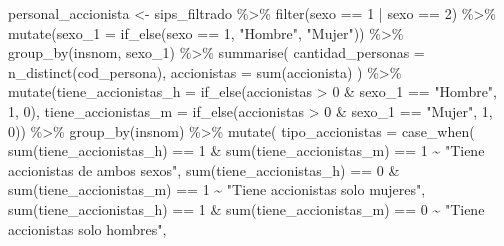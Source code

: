 \documentclass[
  letterpaper,
  DIV=11,
  numbers=noendperiod]{scrreprt}
\newenvironment{Shaded}{\begin{snugshade}}{\end{snugshade}}
\newcommand{\AttributeTok}[1]{\textcolor[rgb]{0.40,0.45,0.13}{#1}}
\newcommand{\DecValTok}[1]{\textcolor[rgb]{0.68,0.00,0.00}{#1}}
\newcommand{\FunctionTok}[1]{\textcolor[rgb]{0.28,0.35,0.67}{#1}}
\newcommand{\NormalTok}[1]{\textcolor[rgb]{0.00,0.23,0.31}{#1}}
\newcommand{\OtherTok}[1]{\textcolor[rgb]{0.00,0.23,0.31}{#1}}
\newcommand{\SpecialCharTok}[1]{\textcolor[rgb]{0.37,0.37,0.37}{#1}}
\newcommand{\StringTok}[1]{\textcolor[rgb]{0.13,0.47,0.30}{#1}}
\begin{document}
\begin{Shaded}
\begin{Highlighting}[]
\NormalTok{personal\_accionista }\OtherTok{\textless{}{-}}\NormalTok{ sips\_filtrado }\SpecialCharTok{\%\textgreater{}\%} 
  \FunctionTok{filter}\NormalTok{(sexo }\SpecialCharTok{==} \DecValTok{1} \SpecialCharTok{|}\NormalTok{ sexo }\SpecialCharTok{==} \DecValTok{2}\NormalTok{) }\SpecialCharTok{\%\textgreater{}\%} 
  \FunctionTok{mutate}\NormalTok{(}\AttributeTok{sexo\_1 =} \FunctionTok{if\_else}\NormalTok{(sexo }\SpecialCharTok{==} \DecValTok{1}\NormalTok{, }\StringTok{"Hombre"}\NormalTok{, }\StringTok{"Mujer"}\NormalTok{)) }\SpecialCharTok{\%\textgreater{}\%} 
  \FunctionTok{group\_by}\NormalTok{(insnom, sexo\_1) }\SpecialCharTok{\%\textgreater{}\%} 
  \FunctionTok{summarise}\NormalTok{(}
    \AttributeTok{cantidad\_personas =} \FunctionTok{n\_distinct}\NormalTok{(cod\_persona),}
    \AttributeTok{accionistas =} \FunctionTok{sum}\NormalTok{(accionista)}
\NormalTok{  ) }\SpecialCharTok{\%\textgreater{}\%} 
  \FunctionTok{mutate}\NormalTok{(}\AttributeTok{tiene\_accionistas\_h =} \FunctionTok{if\_else}\NormalTok{(accionistas }\SpecialCharTok{\textgreater{}} \DecValTok{0} \SpecialCharTok{\&}\NormalTok{ sexo\_1 }\SpecialCharTok{==} \StringTok{"Hombre"}\NormalTok{, }\DecValTok{1}\NormalTok{, }\DecValTok{0}\NormalTok{),}
         \AttributeTok{tiene\_accionistas\_m =} \FunctionTok{if\_else}\NormalTok{(accionistas }\SpecialCharTok{\textgreater{}} \DecValTok{0} \SpecialCharTok{\&}\NormalTok{ sexo\_1 }\SpecialCharTok{==} \StringTok{"Mujer"}\NormalTok{, }\DecValTok{1}\NormalTok{, }\DecValTok{0}\NormalTok{)) }\SpecialCharTok{\%\textgreater{}\%} 
  \FunctionTok{group\_by}\NormalTok{(insnom) }\SpecialCharTok{\%\textgreater{}\%} 
  \FunctionTok{mutate}\NormalTok{(}
    \AttributeTok{tipo\_accionistas =} \FunctionTok{case\_when}\NormalTok{(}
      \FunctionTok{sum}\NormalTok{(tiene\_accionistas\_h) }\SpecialCharTok{==} \DecValTok{1} \SpecialCharTok{\&} \FunctionTok{sum}\NormalTok{(tiene\_accionistas\_m) }\SpecialCharTok{==} \DecValTok{1} \SpecialCharTok{\textasciitilde{}} \StringTok{"Tiene accionistas de ambos sexos"}\NormalTok{,}
      \FunctionTok{sum}\NormalTok{(tiene\_accionistas\_h) }\SpecialCharTok{==} \DecValTok{0} \SpecialCharTok{\&} \FunctionTok{sum}\NormalTok{(tiene\_accionistas\_m) }\SpecialCharTok{==} \DecValTok{1} \SpecialCharTok{\textasciitilde{}} \StringTok{"Tiene accionistas solo mujeres"}\NormalTok{,}
      \FunctionTok{sum}\NormalTok{(tiene\_accionistas\_h) }\SpecialCharTok{==} \DecValTok{1} \SpecialCharTok{\&} \FunctionTok{sum}\NormalTok{(tiene\_accionistas\_m) }\SpecialCharTok{==} \DecValTok{0} \SpecialCharTok{\textasciitilde{}} \StringTok{"Tiene accionistas solo hombres"}\NormalTok{,}

\end{Highlighting}
\end{Shaded}
\end{document}
